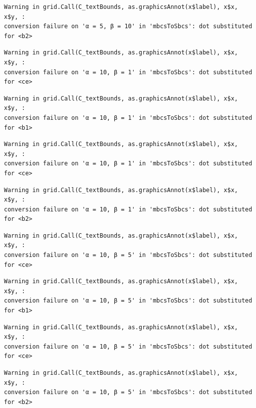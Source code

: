 \documentclass[
  spanish,
  a4paper,
]{scrreport}
\theoremstyle{plain}
\theoremstyle{definition}
\theoremstyle{definition}
\theoremstyle{remark}
\begin{document}
\begin{verbatim}
Warning in grid.Call(C_textBounds, as.graphicsAnnot(x$label), x$x, x$y, :
conversion failure on 'α = 5, β = 10' in 'mbcsToSbcs': dot substituted for <b2>
\end{verbatim}

\begin{verbatim}
Warning in grid.Call(C_textBounds, as.graphicsAnnot(x$label), x$x, x$y, :
conversion failure on 'α = 10, β = 1' in 'mbcsToSbcs': dot substituted for <ce>
\end{verbatim}

\begin{verbatim}
Warning in grid.Call(C_textBounds, as.graphicsAnnot(x$label), x$x, x$y, :
conversion failure on 'α = 10, β = 1' in 'mbcsToSbcs': dot substituted for <b1>
\end{verbatim}

\begin{verbatim}
Warning in grid.Call(C_textBounds, as.graphicsAnnot(x$label), x$x, x$y, :
conversion failure on 'α = 10, β = 1' in 'mbcsToSbcs': dot substituted for <ce>
\end{verbatim}

\begin{verbatim}
Warning in grid.Call(C_textBounds, as.graphicsAnnot(x$label), x$x, x$y, :
conversion failure on 'α = 10, β = 1' in 'mbcsToSbcs': dot substituted for <b2>
\end{verbatim}

\begin{verbatim}
Warning in grid.Call(C_textBounds, as.graphicsAnnot(x$label), x$x, x$y, :
conversion failure on 'α = 10, β = 5' in 'mbcsToSbcs': dot substituted for <ce>
\end{verbatim}

\begin{verbatim}
Warning in grid.Call(C_textBounds, as.graphicsAnnot(x$label), x$x, x$y, :
conversion failure on 'α = 10, β = 5' in 'mbcsToSbcs': dot substituted for <b1>
\end{verbatim}

\begin{verbatim}
Warning in grid.Call(C_textBounds, as.graphicsAnnot(x$label), x$x, x$y, :
conversion failure on 'α = 10, β = 5' in 'mbcsToSbcs': dot substituted for <ce>
\end{verbatim}

\begin{verbatim}
Warning in grid.Call(C_textBounds, as.graphicsAnnot(x$label), x$x, x$y, :
conversion failure on 'α = 10, β = 5' in 'mbcsToSbcs': dot substituted for <b2>
\end{verbatim}
\end{document}
